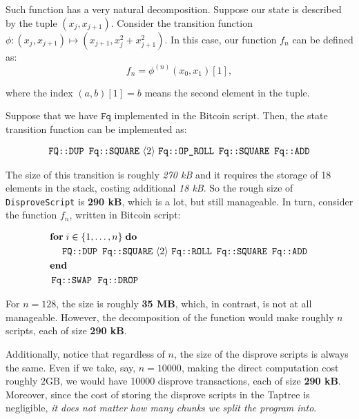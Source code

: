 \documentclass{iacrtrans}
\newcommand{\elem}[1]{\, \langle #1 \rangle \,}
\newcommand{\opcode}[1]{\, \texttt{#1} \,}
\begin{document}
Such function has a very natural decomposition. Suppose our state is described
by the tuple $(x_j,x_{j+1})$. Consider the transition function $\phi: (x_j,
x_{j+1}) \mapsto (x_{j+1}, x_j^2 + x_{j+1}^2)$. In this case, our function $f_n$
can be defined as:
\begin{equation*}
  f_n = \phi^{(n)}(x_0,x_1)[1],
\end{equation*}

where the index $(a, b)[1] = b$ means the second element in the tuple.

Suppose that we have $\mathtt{Fq}$ implemented in the Bitcoin script. Then, the
state transition function can be implemented as:
\begin{empheqboxed}
  \begin{align*}
    \opcode{\texttt{FQ::DUP}} \, \opcode{\texttt{Fq::SQUARE}}
    \elem{2} \opcode{\texttt{Fq::OP\_ROLL}} \,
    \opcode{\texttt{Fq::SQUARE}} \, \opcode{\texttt{Fq::ADD}}
  \end{align*}
\end{empheqboxed}

The size of this transition is roughly \textit{270 kB} and it requires the
storage of 18 elements in the stack, costing additional \textit{18 kB}. So the
rough size of \texttt{DisproveScript} is \textbf{290 kB}, which is a lot, but
still manageable. In turn, consider the function $f_n$, written in Bitcoin
script:
\begin{empheqboxed}
  \begin{align*}
    &\textbf{for} \; i \in \{1,\dots,n\} \; \textbf{do} \\
    & \;\;\;\; \opcode{\texttt{FQ::DUP}} \,
    \opcode{\texttt{Fq::SQUARE}} \elem{2} \opcode{\texttt{Fq::ROLL}}
    \, \opcode{\texttt{Fq::SQUARE}} \, \opcode{\texttt{Fq::ADD}} \\
    & \textbf{end} \\
    & \opcode{\texttt{Fq::SWAP}} \; \opcode{\texttt{Fq::DROP}}
  \end{align*}
\end{empheqboxed}

For $n=128$, the size is roughly \textbf{35 MB}, which, in contrast, is not at
all manageable. However, the decomposition of the function would make roughly
$n$ scripts, each of size \textbf{290 kB}.

Additionally, notice that regardless of $n$, the size of the disprove scripts is
always the same. Even if we take, say, $n=10000$, making the direct computation
cost roughly $2\text{GB}$, we would have 10000 disprove transactions, each of
size \textbf{290 kB}. Moreover, since the cost of storing the disprove scripts
in the Taptree is negligible, \emph{it does not matter how many chunks we split
the program into}.
\end{document}
